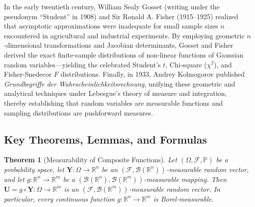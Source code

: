 \documentclass[11pt, letterpaper]{article}
\newtheorem{theorem}{Theorem}[section]
\theoremstyle{definition}
\theoremstyle{remark}
\newcommand{\R}{\mathbb{R}}
\newcommand{\Prob}{\mathbb{P}}
\newcommand{\F}{\mathcal{F}}
\begin{document}
In the early twentieth century, William Sealy Gosset (writing under the pseudonym ``Student'' in 1908) and Sir Ronald A. Fisher (1915--1925) realized that asymptotic approximations were inadequate for small sample sizes $n$ encountered in agricultural and industrial experiments. By employing geometric $n$-dimensional transformations and Jacobian determinants, Gosset and Fisher derived the exact finite-sample distributions of non-linear functions of Gaussian random variables—yielding the celebrated Student's $t$, Chi-square ($\chi^2$), and Fisher-Snedecor $F$ distributions. Finally, in 1933, Andrey Kolmogorov published \emph{Grundbegriffe der Wahrscheinlichkeitsrechnung}, unifying these geometric and analytical techniques under Lebesgue's theory of measure and integration, thereby establishing that random variables are measurable functions and sampling distributions are pushforward measures.

\subsection{Key Theorems, Lemmas, and Formulas}

\begin{theorem}[Measurability of Composite Functions]
\label{thm:composite_measurability}
Let $(\Omega, \F, \Prob)$ be a probability space, let $\mathbf{Y} : \Omega \to \R^n$ be an $(\F, \mathcal{B}(\R^n))$-measurable random vector, and let $g : \R^n \to \R^m$ be a $(\mathcal{B}(\R^n), \mathcal{B}(\R^m))$-measurable mapping. Then $\mathbf{U} = g \circ \mathbf{Y} : \Omega \to \R^m$ is an $(\F, \mathcal{B}(\R^m))$-measurable random vector. In particular, every continuous function $g : \R^n \to \R^m$ is Borel-measurable.
\end{theorem}
\end{document}
